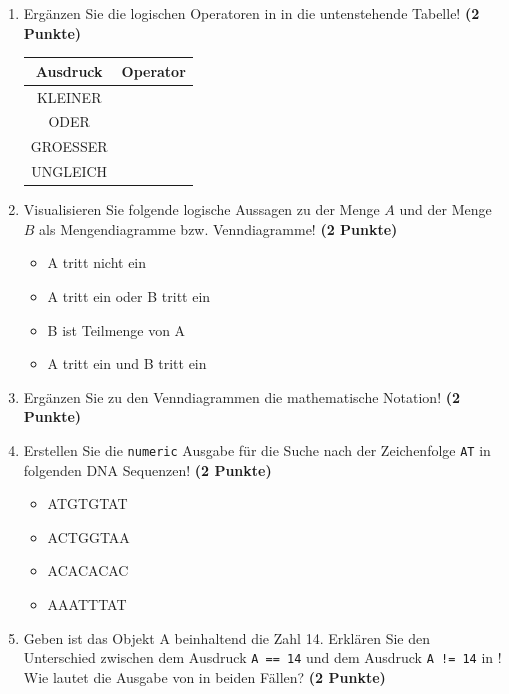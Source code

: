 \documentclass[a4paper, 10pt]{scrartcl}\usepackage[]{graphicx}\usepackage[]{xcolor}
\begin{document}
\begin{enumerate}
\item Erg{\"a}nzen Sie die logischen Operatoren in \Rlogo in die untenstehende Tabelle!
  \textbf{(2 Punkte)}
  \begin{center}
    \begin{tabular}{c|c}
      \textbf{Ausdruck} & \textbf{Operator} \strut\\ \hline
      KLEINER  & \phantom{KLEINER}\strut\\ \hline
      ODER  & \phantom{ODER}\strut\\ \hline
      GROESSER  & \phantom{GROESSER}\strut\\ \hline
      UNGLEICH  & \phantom{UNGLEICH}\strut\\ 
    \end{tabular}
  \end{center}  
\item Visualisieren Sie folgende logische Aussagen zu der Menge $A$ und der Menge
  $B$ als Mengendiagramme bzw. Venndiagramme!
  \textbf{(2 Punkte)}
  \begin{itemize}
  \item A tritt nicht ein
  \item A tritt ein oder B tritt ein
  \item B ist Teilmenge von A
  \item A tritt ein und B tritt ein
  \end{itemize}
\item Erg{\"a}nzen Sie zu den Venndiagrammen die mathematische Notation!
  \textbf{(2 Punkte)}
\item Erstellen Sie die \texttt{numeric} \Rlogo Ausgabe f{\"u}r die
  Suche nach der Zeichenfolge \texttt{AT} in folgenden DNA
  Sequenzen! \textbf{(2 Punkte)}
  \begin{itemize}
  \item ATGTGTAT
  \item ACTGGTAA
  \item ACACACAC
  \item AAATTTAT
  \end{itemize}
\item Geben ist das \Rlogo Objekt A beinhaltend die Zahl
  14. Erkl{\"a}ren Sie den Unterschied zwischen dem Ausdruck \texttt{A == 14}
  und dem Ausdruck \texttt{A != 14} in \Rlogo! Wie lautet die Ausgabe von \Rlogo
  in beiden F{\"a}llen? \textbf{(2 Punkte)}
\end{enumerate}

\clearpage\null
\end{document}
